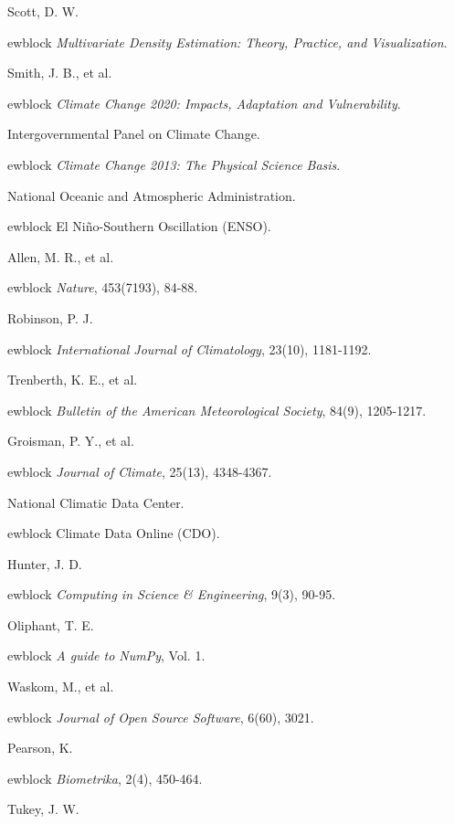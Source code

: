\documentclass{article}
\begin{document}
\begin{thebibliography}{10}

Scott, D. W.

ewblock {\em Multivariate Density Estimation: Theory, Practice, and Visualization}.

Smith, J. B., et al.

ewblock {\em Climate Change 2020: Impacts, Adaptation and Vulnerability}.

Intergovernmental Panel on Climate Change.

ewblock {\em Climate Change 2013: The Physical Science Basis}.

National Oceanic and Atmospheric Administration.

ewblock El Niño-Southern Oscillation (ENSO).

Allen, M. R., et al.

ewblock {\em Nature}, 453(7193), 84-88.

Robinson, P. J.

ewblock {\em International Journal of Climatology}, 23(10), 1181-1192.

Trenberth, K. E., et al.

ewblock {\em Bulletin of the American Meteorological Society}, 84(9), 1205-1217.

Groisman, P. Y., et al.

ewblock {\em Journal of Climate}, 25(13), 4348-4367.

National Climatic Data Center.

ewblock Climate Data Online (CDO).

Hunter, J. D.

ewblock {\em Computing in Science \& Engineering}, 9(3), 90-95.

Oliphant, T. E.

ewblock {\em A guide to NumPy}, Vol. 1.

Waskom, M., et al.

ewblock {\em Journal of Open Source Software}, 6(60), 3021.

Pearson, K.

ewblock {\em Biometrika}, 2(4), 450-464.

Tukey, J. W.


\end{thebibliography}
\end{document}
